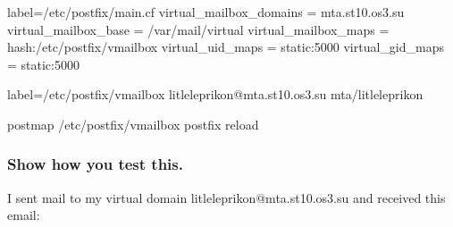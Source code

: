 \documentclass[a4paper,11pt]{article}
\begin{document}
\begin{bashcode*}{label=/etc/postfix/main.cf}
virtual_mailbox_domains = mta.st10.os3.su
virtual_mailbox_base = /var/mail/virtual
virtual_mailbox_maps = hash:/etc/postfix/vmailbox
virtual_uid_maps = static:5000
virtual_gid_maps = static:5000
\end{bashcode*}

\begin{bashcode*}{label=/etc/postfix/vmailbox}
litleleprikon@mta.st10.os3.su mta/litleleprikon  
\end{bashcode*}

\begin{bashcode}
postmap /etc/postfix/vmailbox
postfix reload
\end{bashcode}

\subsubsection{Show how you test this.}
I sent mail to my virtual domain litleleprikon@mta.st10.os3.su and received this email:
\end{document}

